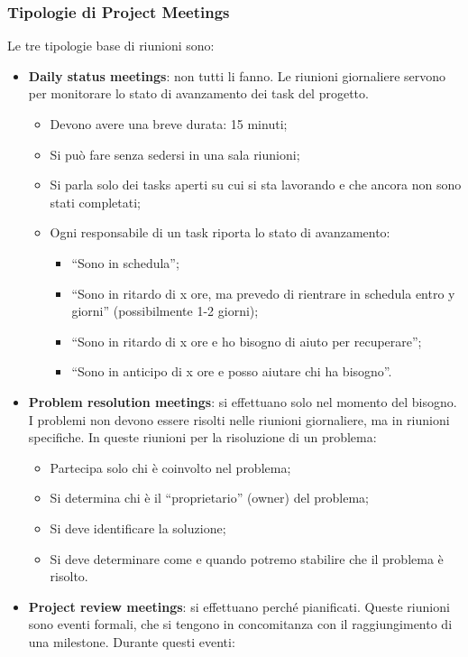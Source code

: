 \subsubsection{Tipologie di Project Meetings}
Le tre tipologie base di riunioni sono:
\begin{itemize}
	\item \textbf{Daily status meetings}: non tutti li fanno. Le riunioni giornaliere servono per monitorare lo stato di avanzamento dei task del progetto.
	\begin{itemize}
		\item Devono avere una breve durata: 15 minuti;
		\item Si può fare senza sedersi in una sala riunioni;
		\item Si parla solo dei tasks aperti su cui si sta lavorando e che ancora non sono stati completati;
		\item Ogni responsabile di un task riporta lo stato di avanzamento:
		\begin{itemize}
			\item “Sono in schedula”;
			\item “Sono in ritardo di x ore, ma prevedo di rientrare in schedula entro y giorni” (possibilmente 1-2 giorni);
			\item “Sono in ritardo di x ore e ho bisogno di aiuto per recuperare”;
			\item “Sono in anticipo di x ore e posso aiutare chi ha bisogno”.
		\end{itemize}
	\end{itemize}
	\item \textbf{Problem resolution meetings}: si effettuano solo nel momento del bisogno. I problemi non devono essere risolti nelle riunioni giornaliere, ma in riunioni specifiche. In queste riunioni per la risoluzione di un problema:
	\begin{itemize}
		\item Partecipa solo chi è coinvolto nel problema;
		\item Si determina chi è il “proprietario” (owner) del problema;
		\item Si deve identificare la soluzione;
		\item Si deve determinare come e quando potremo stabilire che il problema è risolto.
	\end{itemize}
	\item \textbf{Project review meetings}: si effettuano perché pianificati. Queste riunioni sono eventi formali, che si tengono in concomitanza con il raggiungimento di una milestone. Durante questi eventi:

\end{itemize}
